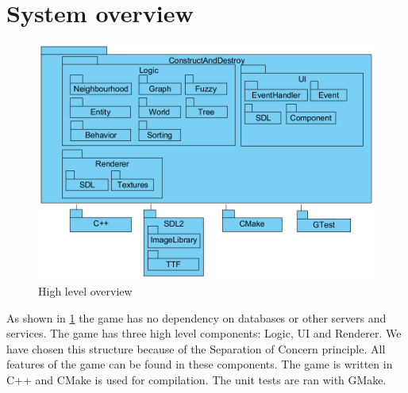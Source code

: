 
\section{System overview}

\begin{figure}[!htb]
    \centering
    \includegraphics[scale=0.75]{res/high-level-overview.png}
    \caption{High level overview}\label{fig:system-overview}
\end{figure}

As shown in \cref{fig:system-overview} the game has no dependency on databases or other servers and services. The game has three high level components: Logic, UI and Renderer. We have chosen this structure because of the Separation of Concern principle. All features of the game can be found in these components. The game is written in C++ and CMake is used for compilation. The unit tests are ran with GMake.
